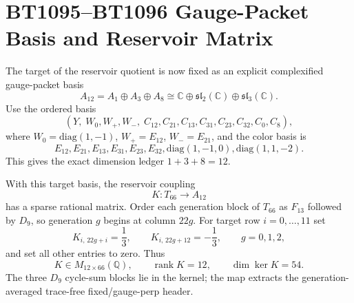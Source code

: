 \section{BT1095--BT1096 Gauge-Packet Basis and Reservoir Matrix}
\label{sec:bt1095-bt1096-a12-k-matrix}

The target of the reservoir quotient is now fixed as an explicit complexified gauge-packet basis
\[
A_{12}=A_1\oplus A_3\oplus A_8\cong \mathbb C\oplus\mathfrak{sl}_2(\mathbb C)\oplus\mathfrak{sl}_3(\mathbb C).
\]
Use the ordered basis
\[
(Y,\;W_0,W_+,W_-,\;C_{12},C_{21},C_{13},C_{31},C_{23},C_{32},C_0,C_8),
\]
where $W_0=\mathrm{diag}(1,-1)$, $W_+=E_{12}$, $W_-=E_{21}$, and the color basis is
\[
E_{12},E_{21},E_{13},E_{31},E_{23},E_{32},\mathrm{diag}(1,-1,0),\mathrm{diag}(1,1,-2).
\]
This gives the exact dimension ledger $1+3+8=12$.

With this target basis, the reservoir coupling
\[
K:T_{66}\to A_{12}
\]
has a sparse rational matrix.  Order each generation block of $T_{66}$ as $F_{13}$ followed by $D_9$, so generation $g$ begins at column $22g$.  For target row $i=0,\ldots,11$ set
\[
K_{i,\,22g+i}=\frac13,
\qquad
K_{i,\,22g+12}=-\frac13,
\qquad g=0,1,2,
\]
and set all other entries to zero.  Thus
\[
K\in M_{12\times66}(\mathbb Q),
\qquad
\operatorname{rank}K=12,
\qquad
\dim\ker K=54.
\]
The three $D_9$ cycle-sum blocks lie in the kernel; the map extracts the generation-averaged trace-free fixed/gauge-perp header.
